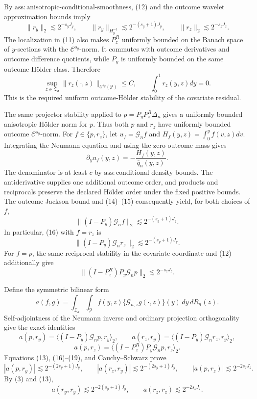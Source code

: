 By \(\mathrm{ass{:}anisotropic\text{-}conditional\text{-}smoothness}\), (12) and the outcome wavelet approximation bounds imply
\[
\|r_y\|_2\lesssim2^{-s_yJ_y},
\qquad
\|r_y\|_{H_y^{-1}}\lesssim2^{-(s_y+1)J_y},
\qquad
\|r_z\|_2\lesssim2^{-s_zJ_z}. \tag{13}
\]
The localization in (11) also makes \(P_z^R\) uniformly bounded on the Banach space of \(y\)-sections with the \(\mathcal C^{s_y}\)-norm.  It commutes with outcome derivatives and outcome difference quotients, while \(P_y\) is uniformly bounded on the same outcome H\"older class.  Therefore
\[
\sup_{z\in\mathcal Z_d}\|r_z(\cdot,z)\|_{\mathcal C^{s_y}(\mathcal Y)}
\le C,
\qquad
\int_0^1r_z(y,z)dy=0. \tag{14}
\]
This is the required uniform outcome-H\"older stability of the covariate residual.

The same projector stability applied to \(p=P_yP_z^R\Delta_n\) gives a uniformly bounded anisotropic H\"older norm for \(p\).  Thus both \(p\) and \(r_z\) have uniformly bounded outcome \(\mathcal C^{s_y}\)-norm.  For \(f\in\{p,r_z\}\), let \(u_f=\mathcal G_nf\) and \(H_f(y,z)=\int_0^yf(v,z)dv\).  Integrating the Neumann equation and using the zero outcome mass gives
\[
\partial_yu_f(y,z)=-\frac{H_f(y,z)}{\bar q_n(y,z)}. \tag{15}
\]
The denominator is at least \(c\) by \(\mathrm{ass{:}conditional\text{-}density\text{-}bounds}\).  The antiderivative supplies one additional outcome order, and products and reciprocals preserve the declared H\"older order under the fixed positive bounds.  The outcome Jackson bound and (14)--(15) consequently yield, for both choices of \(f\),
\[
\|(I-P_y)\mathcal G_nf\|_2
\lesssim2^{-(s_y+1)J_y}. \tag{16}
\]
In particular, (16) with \(f=r_z\) is
\[
\|(I-P_y)\mathcal G_nr_z\|_2
\lesssim2^{-(s_y+1)J_y}. \tag{17}
\]
For \(f=p\), the same reciprocal stability in the covariate coordinate and (12) additionally give
\[
\|(I-P_z^R)P_y\mathcal G_np\|_2\lesssim2^{-s_zJ_z}. \tag{18}
\]

Define the symmetric bilinear form
\[
a(f,g)=\int_{\mathcal Z_d}\int_{\mathcal Y}
f(y,z)\{\mathcal G_{n,z}g(\cdot,z)\}(y)\,dy\,dR_n(z).
\]
Self-adjointness of the Neumann inverse and ordinary projection orthogonality give the exact identities
\[
a(p,r_y)=\langle(I-P_y)\mathcal G_np,r_y\rangle_2,
\qquad
a(r_z,r_y)=\langle(I-P_y)\mathcal G_nr_z,r_y\rangle_2,
\]
\[
a(p,r_z)=\langle(I-P_z^R)P_y\mathcal G_np,r_z\rangle_2. \tag{19}
\]
Equations (13), (16)--(19), and Cauchy--Schwarz prove
\[
|a(p,r_y)|\lesssim2^{-(2s_y+1)J_y},
\qquad
|a(r_z,r_y)|\lesssim2^{-(2s_y+1)J_y},
\qquad
|a(p,r_z)|\lesssim2^{-2s_zJ_z}. \tag{20}
\]
By (3) and (13),
\[
a(r_y,r_y)\lesssim2^{-2(s_y+1)J_y},
\qquad
a(r_z,r_z)\lesssim2^{-2s_zJ_z}. \tag{21}
\]

